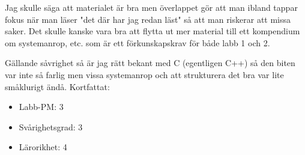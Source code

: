 \documentclass[10pt,a4paper]{article}
\begin{document}
Jag skulle säga att materialet är bra men överlappet gör att man ibland tappar fokus när man läser "det där har jag redan läst" så att man riskerar att missa saker. Det skulle kanske vara bra att flytta ut mer material till ett kompendium om systemanrop, etc. som är ett förkunskapskrav för både labb 1 och 2.

Gällande såvrighet så är jag rätt bekant med C (egentligen C++) så den biten var inte så farlig men vissa systemanrop och att strukturera det bra var lite småklurigt ändå. Kortfattat:

\begin{itemize}
\item Labb-PM: 3
\item Svårighetsgrad: 3
\item Lärorikhet: 4
\end{itemize}
\end{document}
